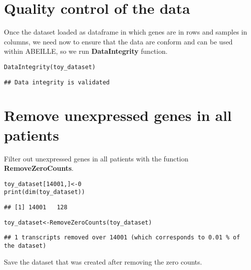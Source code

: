 \documentclass[9pt]{article}\usepackage[]{graphicx}\usepackage[usenames,dvipsnames]{color}
\newcommand{\hlnum}[1]{\textcolor[rgb]{0.816,0.125,0.439}{#1}}%
\newcommand{\hlstd}[1]{\textcolor[rgb]{0.251,0.251,0.251}{#1}}%
\newcommand{\hlkwb}[1]{\textcolor[rgb]{0,0,0}{#1}}%
\newcommand{\hlkwd}[1]{\textcolor[rgb]{0.878,0.439,0.125}{#1}}%
\newenvironment{knitrout}{}{} %
\begin{document}
\section{Quality control of the data}

Once the dataset loaded as dataframe in which genes are in rows and samples in columns, we need now to ensure that the data are conform and can be used within ABEILLE, so we run \textbf{DataIntegrity} function.

\begin{knitrout}
\color{fgcolor}\begin{kframe}
\begin{alltt}
\hlkwd{DataIntegrity}\hlstd{(toy_dataset)}
\end{alltt}
\begin{verbatim}
## Data integrity is validated
\end{verbatim}
\end{kframe}
\end{knitrout}

\section{Remove unexpressed genes in all patients}

Filter out unexpressed genes in all patients with the function \textbf{RemoveZeroCounts}.

\begin{knitrout}
\color{fgcolor}\begin{kframe}
\begin{alltt}
\hlstd{toy_dataset[}\hlnum{14001}\hlstd{,]} \hlkwb{<-} \hlnum{0}
\hlkwd{print}\hlstd{(}\hlkwd{dim}\hlstd{(toy_dataset))}
\end{alltt}
\begin{verbatim}
## [1] 14001   128
\end{verbatim}
\begin{alltt}
\hlstd{toy_dataset} \hlkwb{<-} \hlkwd{RemoveZeroCounts}\hlstd{(toy_dataset)}
\end{alltt}
\begin{verbatim}
## 1 transcripts removed over 14001 (which corresponds to 0.01 % of the dataset)
\end{verbatim}
\end{kframe}
\end{knitrout}

Save the dataset that was created after removing the zero counts.
\end{document}

